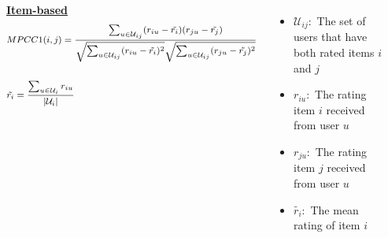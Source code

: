 \begin{frame}
\begin{columns}
\begin{itemize}
        \end{itemize}
        \centering
        \underline{\textbf{Item-based}}
        \begin{equation*}
            \footnotesize
            \begin{split}
            &MPCC1(i,j) = \frac{\sum_{u \in \mathcal{U}_{ij}}(r_{iu}-\tilde{r_{i}})(r_{ju}-\tilde{r_{j}})}
                             {\sqrt{\sum_{u \in \mathcal{U}_{ij}}(r_{iu}-\tilde{r_{i}})^2}
                              \sqrt{\sum_{u \in \mathcal{U}_{ij}}(r_{ju}-\tilde{r_{j}})^2}} \\\\
            &\tilde{r_{i}} = \frac{\sum_{u \in \mathcal{U}_i}r_{iu}}
                                {\mathopen|\mathcal{U}_i\mathclose|}
        \end{split}
        \end{equation*}
        \tiny
        \begin{itemize}
            \item $\mathcal{U}_{ij}:$ The set of users that have both rated items $i$ and $j$
            \item $r_{iu}:$ The rating item $i$ received from user $u$
            \item $r_{ju}:$ The rating item $j$ received from user $u$
            \item $\tilde{r_{i}}:$ The mean rating of item $i$

        \end{itemize}
    \end{columns}
\end{frame}
